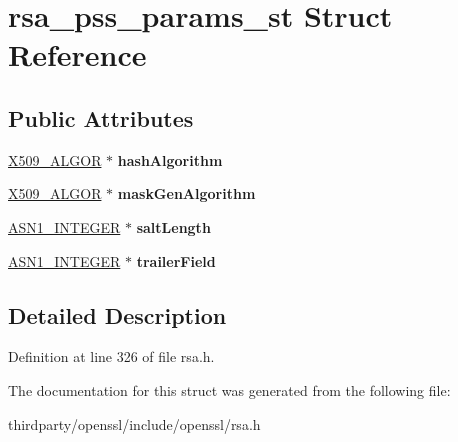 \hypertarget{structrsa__pss__params__st}{}\section{rsa\+\_\+pss\+\_\+params\+\_\+st Struct Reference}
\label{structrsa__pss__params__st}
\subsection*{Public Attributes}
\begin{DoxyCompactItemize}
\item 
\mbox{\label{structrsa__pss__params__st_aac829ac297745706cbaf333d81b4de9e}} 
\hyperlink{struct_x509__algor__st}{X509\+\_\+\+A\+L\+G\+OR} $\ast$ {\bfseries hash\+Algorithm}
\item 
\mbox{\label{structrsa__pss__params__st_a39f7b07fe870a2d415ca2edd68e68889}} 
\hyperlink{struct_x509__algor__st}{X509\+\_\+\+A\+L\+G\+OR} $\ast$ {\bfseries mask\+Gen\+Algorithm}
\item 
\mbox{\label{structrsa__pss__params__st_aa3831adeab05f41488cc226fff064091}} 
\hyperlink{structasn1__string__st}{A\+S\+N1\+\_\+\+I\+N\+T\+E\+G\+ER} $\ast$ {\bfseries salt\+Length}
\item 
\mbox{\label{structrsa__pss__params__st_a67aede448229164c1c5e359c3020ae53}} 
\hyperlink{structasn1__string__st}{A\+S\+N1\+\_\+\+I\+N\+T\+E\+G\+ER} $\ast$ {\bfseries trailer\+Field}
\end{DoxyCompactItemize}


\subsection{Detailed Description}


Definition at line 326 of file rsa.\+h.



The documentation for this struct was generated from the following file\+:\begin{DoxyCompactItemize}
\item 
thirdparty/openssl/include/openssl/rsa.\+h\end{DoxyCompactItemize}
